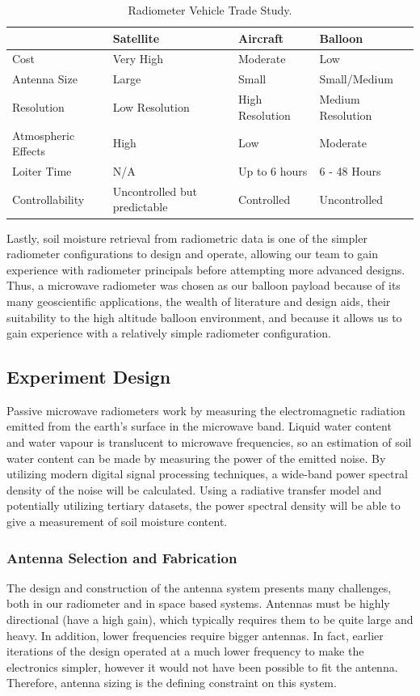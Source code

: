 \documentclass[12pt]{article}
\begin{document}
\begin{table}[!h]
	\centering
	\vspace{0.5cm}
	\renewcommand{\arraystretch}{1.3}
	\caption{Radiometer Vehicle Trade Study. }
	\label{tab:vehicle_trade}
	\begin{tabularx}{\textwidth}{llll}
		\toprule
						& Satellite & Aircraft & Balloon \\		
		\midrule
		Cost					&Very High&Moderate&Low \\ 
		Antenna Size 			&Large&Small&Small/Medium \\
		Resolution 				&Low Resolution&High Resolution&Medium Resolution \\ 
		Atmospheric Effects		&High&Low&Moderate \\ 
		Loiter Time				&N/A&Up to 6 hours&6 - 48 Hours \\ 
		Controllability			&Uncontrolled but predictable&Controlled&Uncontrolled 
	\end{tabularx}
\end{table}

Lastly, soil moisture retrieval from radiometric data is one of the simpler radiometer configurations to design and operate, allowing our team to gain experience with radiometer principals before attempting more advanced designs. Thus, a microwave radiometer was chosen as our balloon payload because of its many geoscientific applications, the wealth of literature and design aids, their suitability to the high altitude balloon environment, and because it allows us to gain experience with a relatively simple radiometer configuration.
 
\subsection{Experiment Design}

Passive microwave radiometers work by measuring the electromagnetic radiation emitted from the earth's surface in the microwave band. Liquid water content and water vapour is translucent to microwave frequencies, so an estimation of soil water content can be made by measuring the power of the emitted noise. By utilizing modern digital signal processing techniques, a wide-band power spectral density of the noise will be calculated. Using a radiative transfer model and potentially utilizing tertiary datasets, the power spectral density will be able to give a measurement of soil moisture content.

\subsubsection{Antenna Selection and Fabrication}
The design and construction of the antenna system presents many challenges, both in our radiometer and in space 
based systems. Antennas must be highly directional (have a high gain), which typically requires them to be quite large and heavy. In addition, lower frequencies require bigger antennas. In fact, earlier iterations of the design 
operated at a much lower frequency to make the electronics simpler, however it would not have been possible to fit
the antenna. Therefore, antenna sizing is the defining constraint on this system.\\
\end{document}
